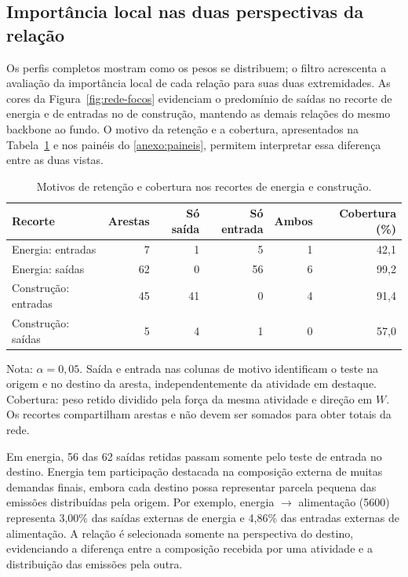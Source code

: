 \subsection{Importância local nas duas perspectivas da relação}

Os perfis completos mostram como os pesos se distribuem; o filtro acrescenta a avaliação da importância local de cada relação para suas duas extremidades. As cores da Figura~\ref{fig:rede-focos} evidenciam o predomínio de saídas no recorte de energia e de entradas no de construção, mantendo as demais relações do mesmo backbone ao fundo. O motivo da retenção e a cobertura, apresentados na Tabela~\ref{tab:motivos-casos} e nos painéis do \ref{anexo:paineis}, permitem interpretar essa diferença entre as duas vistas.

\begin{table}[htbp]
\centering
\caption{Motivos de retenção e cobertura nos recortes de energia e construção.}
\label{tab:motivos-casos}
\small
\begin{tabular}{@{}lrrrrr@{}}
\toprule
Recorte & Arestas & Só saída & Só entrada & Ambos & Cobertura (\%) \\
\midrule
Energia: entradas & 7 & 1 & 5 & 1 & 42,1 \\
Energia: saídas & 62 & 0 & 56 & 6 & 99,2 \\
Construção: entradas & 45 & 41 & 0 & 4 & 91,4 \\
Construção: saídas & 5 & 4 & 1 & 0 & 57,0 \\
\bottomrule
\end{tabular}
\begin{notas}
Nota: $\alpha=0{,}05$. Saída e entrada nas colunas de motivo identificam o teste na origem e no destino da aresta, independentemente da atividade em destaque. Cobertura: peso retido dividido pela força da mesma atividade e direção em $W$. Os recortes compartilham arestas e não devem ser somados para obter totais da rede.
\end{notas}
\end{table}

Em energia, 56 das 62 saídas retidas passam somente pelo teste de entrada no destino. Energia tem participação destacada na composição externa de muitas demandas finais, embora cada destino possa representar parcela pequena das emissões distribuídas pela origem. Por exemplo, energia $\rightarrow$ alimentação (5600) representa 3,00\% das saídas externas de energia e 4,86\% das entradas externas de alimentação. A relação é selecionada somente na perspectiva do destino, evidenciando a diferença entre a composição recebida por uma atividade e a distribuição das emissões pela outra.

